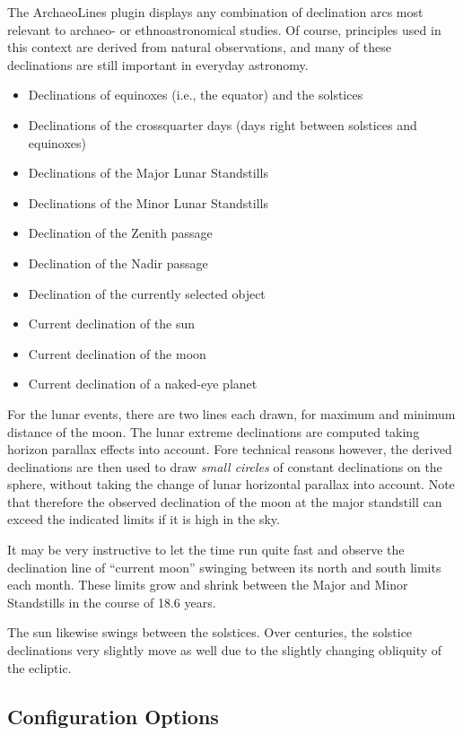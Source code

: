 The ArchaeoLines plugin displays any combination of declination arcs most
relevant to archaeo- or ethnoastronomical studies. Of course, principles
used in this context are derived from natural observations, and many of
these declinations are still important in everyday astronomy.

\begin{itemize}
\item Declinations of equinoxes (i.e., the equator) and the solstices
\item Declinations of the crossquarter days (days right between solstices and equinoxes)
\item Declinations of the Major Lunar Standstills
\item Declinations of the Minor Lunar Standstills
\item Declination of the Zenith passage
\item Declination of the Nadir passage
\item Declination of the currently selected object
\item Current declination of the sun
\item Current declination of the moon
\item Current declination of a naked-eye planet
\end{itemize}

\noindent For the lunar events, there are two lines each drawn, for
maximum and minimum distance of the moon.  The lunar extreme
declinations are computed taking horizon parallax effects into
account. Fore technical reasons however, the derived declinations are
then used to draw \emph{small circles} of constant declinations on the
sphere, without taking the change of lunar horizontal parallax into
account.  Note that therefore the observed declination of the moon at
the major standstill can exceed the indicated limits if it is high in
the sky.

It may be very instructive to let the time run quite fast and observe
the declination line of ``current moon'' swinging between its north
and south limits each month.  These limits grow and shrink between the
Major and Minor Standstills in the course of 18.6 years.

The sun likewise swings between the solstices. Over centuries, the
solstice declinations very slightly move as well due to the slightly
changing obliquity of the ecliptic.


\subsection{Configuration Options}
\label{sec:plugin:ArchaeoLines:configuration}

